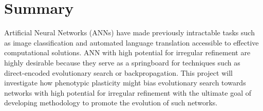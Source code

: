 \section{Summary}
Artificial Neural Networks (ANNs) have made previously intractable tasks such as image classification and automated language translation accessible to effective computational solutions. ANN with high potential for irregular refinement are highly desirable because they serve as a springboard for techniques such as direct-encoded evolutionary search or backpropagation. This project will investigate how phenotypic plasticity might bias evolutionary search towards networks with high potential for irregular refinement with the ultimate goal of developing methodology to promote the evolution of such networks.
